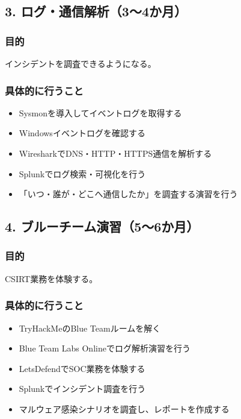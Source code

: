 \documentclass[a4paper,11pt,lualatex,ja=standard]{bxjsarticle}
\begin{document}
\subsection*{3. ログ・通信解析（3〜4か月）}

\subsubsection*{目的}
インシデントを調査できるようになる。

\subsubsection*{具体的に行うこと}

\begin{itemize}
    \item Sysmonを導入してイベントログを取得する
    \item Windowsイベントログを確認する
    \item WiresharkでDNS・HTTP・HTTPS通信を解析する
    \item Splunkでログ検索・可視化を行う
    \item 「いつ・誰が・どこへ通信したか」を調査する演習を行う
\end{itemize}

\subsection*{4. ブルーチーム演習（5〜6か月）}

\subsubsection*{目的}
CSIRT業務を体験する。

\subsubsection*{具体的に行うこと}

\begin{itemize}
    \item TryHackMeのBlue Teamルームを解く
    \item Blue Team Labs Onlineでログ解析演習を行う
    \item LetsDefendでSOC業務を体験する
    \item Splunkでインシデント調査を行う
    \item マルウェア感染シナリオを調査し、レポートを作成する
\end{itemize}
\end{document}
